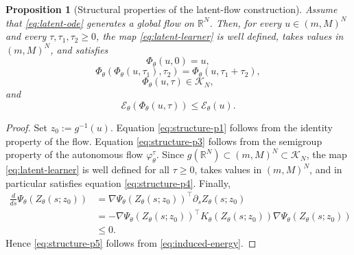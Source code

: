 \documentclass[11pt]{article}
\newtheorem{proposition}{Proposition}
\newcommand{\R}{\mathbb{R}}
\newcommand{\cK}{\mathcal{K}}
\newcommand{\cE}{\mathcal{E}}
\newcommand{\PhiT}{\Phi_{\theta}}
\begin{document}
\begin{proposition}[Structural properties of the latent-flow construction]\label{prop:structure}
Assume that \eqref{eq:latent-ode} generates a global flow on \(\R^N\). Then, for every \(u\in (m,M)^N\) and every \(\tau,\tau_1,\tau_2\ge 0\), the map \eqref{eq:latent-learner} is well defined, takes values in \((m,M)^N\), and satisfies
\begin{equation}\label{eq:structure-p1}
\PhiT(u,0)=u,
\end{equation}
\begin{equation}\label{eq:structure-p3}
\PhiT(\PhiT(u,\tau_1),\tau_2)=\PhiT(u,\tau_1+\tau_2),
\end{equation}
\begin{equation}\label{eq:structure-p4}
\PhiT(u,\tau)\in \cK_N,
\end{equation}
and
\begin{equation}\label{eq:structure-p5}
\cE_{\theta}(\PhiT(u,\tau))\le \cE_{\theta}(u).
\end{equation}
\end{proposition}

\begin{proof}
Set \(z_0:=g^{-1}(u)\). Equation \eqref{eq:structure-p1} follows from the identity property of the flow. Equation \eqref{eq:structure-p3} follows from the semigroup property of the autonomous flow \(\varphi_{\theta}^{\tau}\). Since \(g(\R^N)\subset (m,M)^N\subset \cK_N\), the map \eqref{eq:latent-learner} is well defined for all \(\tau\ge 0\), takes values in \((m,M)^N\), and in particular satisfies equation \eqref{eq:structure-p4}. Finally,
\begin{align*}
\frac{d}{ds}\Psi_{\theta}(Z_{\theta}(s;z_0))
&=\nabla \Psi_{\theta}(Z_{\theta}(s;z_0))^\top \partial_s Z_{\theta}(s;z_0) \\
&=-\nabla \Psi_{\theta}(Z_{\theta}(s;z_0))^\top K_{\theta}(Z_{\theta}(s;z_0))\nabla \Psi_{\theta}(Z_{\theta}(s;z_0)) \\
&\le 0.
\end{align*}
Hence \eqref{eq:structure-p5} follows from \eqref{eq:induced-energy}.
\end{proof}
\end{document}
